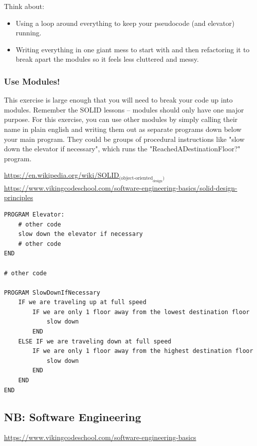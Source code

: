 \documentclass[11pt]{article}
\begin{document}
Think about:

\begin{itemize}
\item Using a loop around everything to keep your pseudocode (and elevator) 
running.
\item Writing everything in one giant mess to start with and then refactoring it
to break apart the modules so it feels less cluttered and messy.
\end{itemize}

\subsubsection{Use Modules!}
\label{sec-12-1-3}

This exercise is large enough that you will need to break your code up into
modules. Remember the SOLID lessons -- modules should only have one major 
purpose. For this exercise, you can use other modules by simply calling 
their name in plain english and writing them out as separate programs down
below your main program. They could be groups of procedural instructions 
like "slow down the elevator if necessary", which runs the 
"ReachedADestinationFloor?" program.

\url{https://en.wikipedia.org/wiki/SOLID}$_{\text{(object-oriented}_{\text{design}}\text{)}}$
\url{https://www.vikingcodeschool.com/software-engineering-basics/solid-design-principles}

\begin{verbatim}
PROGRAM Elevator:
    # other code
    slow down the elevator if necessary
    # other code
END

# other code

PROGRAM SlowDownIfNecessary
    IF we are traveling up at full speed
        IF we are only 1 floor away from the lowest destination floor
            slow down
        END
    ELSE IF we are traveling down at full speed
        IF we are only 1 floor away from the highest destination floor
            slow down
        END
    END
END
\end{verbatim}

\subsection{NB: Software Engineering}
\label{sec-12-2}

\url{https://www.vikingcodeschool.com/software-engineering-basics}
\end{document}
